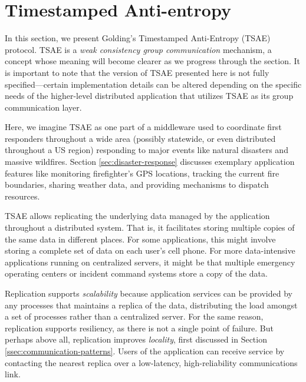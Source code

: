 \documentclass[]             %
{NASA}                       %
\theoremstyle{definition}
\begin{document}
\section{Timestamped Anti-entropy}
\label{sec:TSAE}
In this section, we present Golding's Timestamped Anti-Entropy (TSAE)
protocol. TSAE is a \emph{weak consistency group communication}
mechanism, a concept whose meaning will become clearer as we progress
through the section. It is important to note that the version of TSAE
presented here is not fully specified---certain implementation details
can be altered depending on the specific needs of the higher-level
distributed application that utilizes TSAE as its group communication
layer.

Here, we imagine TSAE as one part of a middleware used to coordinate
first responders throughout a wide area (possibly statewide, or even
distributed throughout a US region) responding to major events like
natural disasters and massive wildfires. Section
\ref{sec:disaster-response} discusses exemplary application features
like monitoring firefighter's GPS locations, tracking the current fire
boundaries, sharing weather data, and providing mechanisms to dispatch
resources.

TSAE allows replicating the underlying data managed by the application
throughout a distributed system. That is, it facilitates storing
multiple copies of the same data in different places. For some
applications, this might involve storing a complete set of data on
each user's cell phone. For more data-intensive applications running
on centralized servers, it might be that multiple emergency operating
centers or incident command systems store a copy of the data.

Replication supports \emph{scalability} because application services
can be provided by any processes that maintains a replica of the data,
distributing the load amongst a set of processes rather than a
centralized server. For the same reason, replication supports
resiliency, as there is not a single point of failure. But perhaps
above all, replication improves \emph{locality}, first discussed in
Section \ref{ssec:communication-patterns}. Users of the application
can receive service by contacting the nearest replica over a
low-latency, high-reliability communications link.

\end{document}
